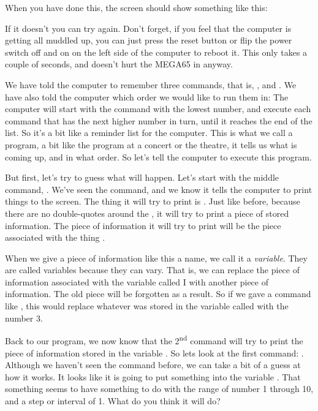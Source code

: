 \needspace{4cm} %
When you have done this, the screen should show something like this:


If it doesn't you
can try again. Don't forget, if you feel that the computer is getting all muddled up,
you can just press the reset button or flip the power switch off and on on the left side of the
computer to reboot it. This only takes a couple of seconds, and doesn't hurt the MEGA65
in anyway.

We have told the computer to remember three commands, that is, ,
and .  We have also told the computer which order we would like to run them in: The
computer will start with the command with the lowest number, and execute each command that
has the next higher number in turn, until it reaches the end of the list.  So it's a bit like
a reminder list for the computer. This is what we call a program, a bit like the program at
a concert or the theatre, it tells us what is coming up, and in what order.
So let's tell the computer to execute this program.

But first, let's try to guess what will happen.  Let's start with the middle command, .
We've seen the  command, and we know it tells the computer to print things to the screen.
The thing it will try to print is .  Just like before, because there are no double-quotes
around the , it will try to print a piece of stored information.  The piece of information
it will try to print will be the piece associated with the thing .

When we give a piece of
information like this a name, we call it a {\em variable}.  They are called
variables because they can vary.  That is, we can replace the piece of information associated
with the variable called I with another piece of information.  The old piece will be forgotten
as a result.  So if we gave a command like , this would replace whatever was stored
in the variable called  with the number 3.

Back to our program, we now know that the 2\textsuperscript{nd} command will try to print the piece of information
stored in the variable .  So lets look at the first command: .  Although
we haven't seen the  command before, we can take a bit of a guess at how it works. It looks like
it is going to put something into the variable .  That something seems to have something to do
with the range of number 1 through 10, and a step or interval of 1.  What do you think it will do?

